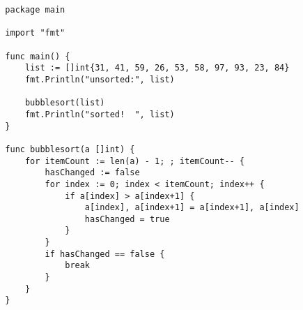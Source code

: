 \documentclass{article}
\begin{document}
\begin{verbatim}
  package main
 
  import "fmt"
  
  func main() {
      list := []int{31, 41, 59, 26, 53, 58, 97, 93, 23, 84}
      fmt.Println("unsorted:", list)
  
      bubblesort(list)
      fmt.Println("sorted!  ", list)
  }
  
  func bubblesort(a []int) {
      for itemCount := len(a) - 1; ; itemCount-- {
          hasChanged := false
          for index := 0; index < itemCount; index++ {
              if a[index] > a[index+1] {
                  a[index], a[index+1] = a[index+1], a[index]
                  hasChanged = true
              }
          }
          if hasChanged == false {
              break
          }
      }
  }
\end{verbatim}
\end{document}
